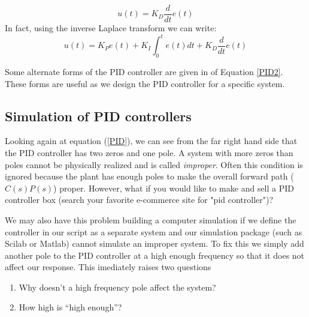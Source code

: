 \[
u(t) = K_D \frac{d}{dt}e(t)
\]
In fact, using the inverse Laplace transform we can write:
\[
u(t) = K_P e(t)  + K_I \int_0^t e(t) dt + K_D \frac{d}{dt}e(t)
\]


Some alternate forms of the PID controller are given in of Equation \ref{PID2}.  These forms are useful as we design the PID controller for a specific system.



\subsection{Simulation of PID controllers}\label{simulationPIDcontrollers}

%
%


Looking again at equation (\ref{PID}), we can see from the far right hand side that the PID controller has two zeros and one pole.   A system with more zeros than poles cannot be physically realized and is called {\it improper}.   Often this condition is ignored because the plant has enough poles to make the overall forward path ($C(s)P(s)$) proper.  However, what if you would like to make and sell a PID controller box
(search your favorite e-commerce site for "pid controller")?

We may also have this problem building a computer simulation if we define the controller in our script as a separate system and our simulation package (such as Scilab or Matlab)  cannot simulate an improper system.
To fix this we simply add another pole to the PID controller at a high enough frequency so that it does not affect our response.  This imediately raises two questions




\begin{enumerate}
  \item Why doesn't a high frequency pole affect the system?
  \item How high is ``high enough''?
\end{enumerate}






